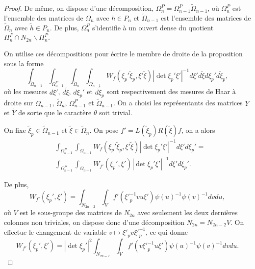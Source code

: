 \documentclass{amsart}
\begin{document}
\begin{proof}
De même, on dispose d'une décomposition, $\Omega^P_n = \Omega^P_{n-1} \widetilde{\Omega}_{n-1}$, où $\Omega^P_n$ est l'ensemble des matrices de $\Omega_n$ avec $h \in P_n$ et $\widetilde{\Omega}_{n-1}$ est l'ensemble des matrices de $\widetilde{\Omega}_n$ avec $\widetilde{h} \in P_n$. De plus, $\Omega^P_n$ s'identifie à un ouvert dense du quotient $H^P_n \cap N_{2n} \backslash{H^P_n}$.

On utilise ces décompositions pour écrire le membre de droite de la proposition sous la forme
\begin{equation}
\int_{\widetilde{\Omega}_{n-1}} \int_{\Omega^P_{n-1}} \int_{\widetilde{\Omega}_n} \int_{\Omega_{n-1}} W_f(\xi_p'\widetilde{\xi}_p, \xi'\widetilde{\xi}) |\det \xi_p'\xi'|^{-1} d\xi' d\widetilde{\xi} d\xi_p' d\widetilde{\xi}_p,
\end{equation}
où les mesures $d\xi'$, $d\widetilde{\xi}$, $d\xi_p'$ et $d\widetilde{\xi}_p$ sont respectivement des mesures de Haar à droite sur $\Omega_{n-1}$, $\widetilde{\Omega}_n$,  $\Omega^P_{n-1}$ et $\widetilde{\Omega}_{n-1}$. On a choisi les représentants des matrices $Y$ et $\widetilde{Y}$ de sorte que le caractère $\theta$ soit trivial.

On fixe $\widetilde{\xi}_p \in \widetilde{\Omega}_{n-1}$ et $\widetilde{\xi} \in \widetilde{\Omega}_n$. On pose $f' = L(\widetilde{\xi}_p)R(\widetilde{\xi})f$, on a alors
 \begin{equation}
 \begin{split}
 & \int_{\Omega^P_{n-1}} \int_{\Omega_{n-1}} W_f(\xi_p'\widetilde{\xi}_p, \xi'\widetilde{\xi}) |\det \xi_p'\xi'|^{-1} d\xi' d\xi_p'= \\
 & \int_{\Omega^P_{n-1}} \int_{\Omega_{n-1}} W_{f'}(\xi_p', \xi') |\det \xi_p'\xi'|^{-1} d\xi' d\xi_p'.
 \end{split}
 \end{equation}

De plus,
 \begin{equation}
 W_{f'}(\xi_p', \xi') = \int_{N_{2n-2}} \int_V f'({\xi'}_p^{-1} v u \xi') \psi(u)^{-1}\psi(v)^{-1} dv du,
 \end{equation}
 où $V$ est le sous-groupe des matrices de $N_{2n}$ avec seulement les deux dernières colonnes non triviales, on dispose donc d'une décomposition $N_{2n} = N_{2n-2}V$. On effectue le changement de variable $v \mapsto {\xi'}_p v {\xi'}_p^{-1}$, ce qui donne
 \begin{equation}
 W_{f'}(\xi_p', \xi') = |\det \xi_p'|^{2}\int_{N_{2n-2}} \int_V f'(v {\xi'}_p^{-1} u \xi') \psi(u)^{-1}\psi(v)^{-1} dv du.
 \end{equation}


\end{proof}
\end{document}

